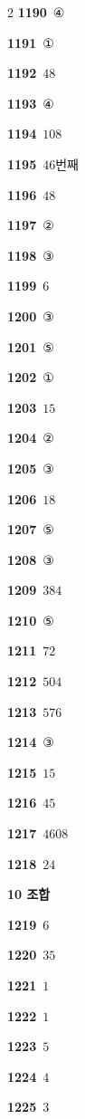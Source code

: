 \documentclass[10pt,a4paper]{article}
\begin{document}
\begin{multicols}{2}
\noindent\textbf{1190}\ ④\par
\noindent\textbf{1191}\ ①\par
\noindent\textbf{1192}\ $48$\par
\noindent\textbf{1193}\ ④\par
\noindent\textbf{1194}\ $108$\par
\noindent\textbf{1195}\ $46$번째\par
\noindent\textbf{1196}\ $48$\par
\noindent\textbf{1197}\ ②\par
\noindent\textbf{1198}\ ③\par
\noindent\textbf{1199}\ $6$\par
\noindent\textbf{1200}\ ③\par
\noindent\textbf{1201}\ ⑤\par
\noindent\textbf{1202}\ ①\par
\noindent\textbf{1203}\ $15$\par
\noindent\textbf{1204}\ ②\par
\noindent\textbf{1205}\ ③\par
\noindent\textbf{1206}\ $18$\par
\noindent\textbf{1207}\ ⑤\par
\noindent\textbf{1208}\ ③\par
\noindent\textbf{1209}\ $384$\par
\noindent\textbf{1210}\ ⑤\par
\noindent\textbf{1211}\ $72$\par
\noindent\textbf{1212}\ $504$\par
\noindent\textbf{1213}\ $576$\par
\noindent\textbf{1214}\ ③\par
\noindent\textbf{1215}\ $15$\par
\noindent\textbf{1216}\ $45$\par
\noindent\textbf{1217}\ $4608$\par
\noindent\textbf{1218}\ $24$\par
\noindent\textbf{10 조합}\par\smallskip
\noindent\textbf{1219}\ $6$\par
\noindent\textbf{1220}\ $35$\par
\noindent\textbf{1221}\ $1$\par
\noindent\textbf{1222}\ $1$\par
\noindent\textbf{1223}\ $5$\par
\noindent\textbf{1224}\ $4$\par
\noindent\textbf{1225}\ $3$\par

\end{multicols}
\end{document}
